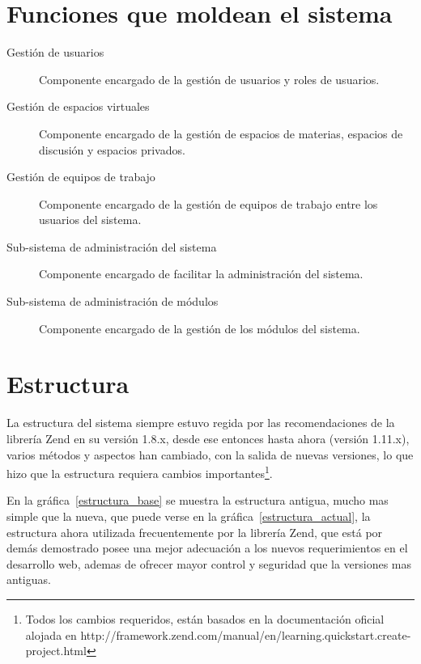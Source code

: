 \section{Funciones que moldean el sistema}
\begin{description}
\item [Gestión de usuarios] Componente encargado de la gestión de usuarios y roles de usuarios.
\item [Gestión de espacios virtuales] Componente encargado de la gestión de espacios de materias, espacios de discusión y espacios privados.
\item [Gestión de equipos de trabajo] Componente encargado de la gestión de equipos de trabajo entre los usuarios del sistema.
\item [Sub-sistema de administración del sistema] Componente encargado de facilitar la administración del sistema.
\item [Sub-sistema de administración de módulos] Componente encargado de la gestión de los módulos del sistema.
\end{description}

\section{Estructura}
La estructura del sistema siempre estuvo regida por las recomendaciones de la librería Zend en su versión 1.8.x, desde ese entonces hasta ahora (versión 1.11.x), varios métodos y aspectos han cambiado, con la salida de nuevas versiones, lo que hizo que la estructura requiera cambios importantes\footnote{Todos los cambios requeridos, están basados en la documentación oficial alojada en http://framework.zend.com/manual/en/learning.quickstart.create-project.html}.

En la gráfica~\ref{estructura_base} se muestra la estructura antigua, mucho mas simple que la nueva, que puede verse en la gráfica~\ref{estructura_actual}, la estructura ahora utilizada frecuentemente por la librería Zend, que está por demás demostrado posee una mejor adecuación a los nuevos requerimientos en el desarrollo web, ademas de ofrecer mayor control y seguridad que la versiones mas antiguas\cite{Gilmore}.

